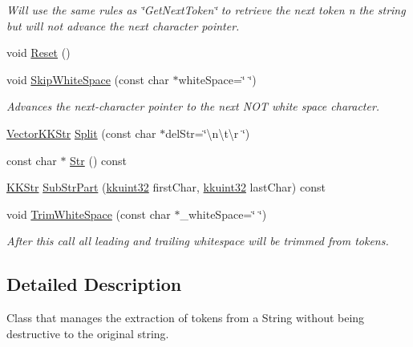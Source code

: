 \begin{DoxyCompactItemize}
\begin{DoxyCompactList}\small\item\em Will use the same rules as \char`\"{}\+Get\+Next\+Token\char`\"{} to retrieve the next token n the string but will not advance the next character pointer. \end{DoxyCompactList}\item 
void \hyperlink{class_k_k_b_1_1_k_k_str_parser_a67bd099f770d4a46a3d6f65c4112c00c}{Reset} ()
\item 
void \hyperlink{class_k_k_b_1_1_k_k_str_parser_a8e19e3cdb9d6c2aa6058d527fef76d01}{Skip\+White\+Space} (const char $\ast$white\+Space=\char`\"{} \char`\"{})
\begin{DoxyCompactList}\small\item\em Advances the next-\/character pointer to the next N\+OT white space character. \end{DoxyCompactList}\item 
\hyperlink{class_k_k_b_1_1_vector_k_k_str}{Vector\+K\+K\+Str} \hyperlink{class_k_k_b_1_1_k_k_str_parser_a625b103381cce53ddb55afe60abec4c2}{Split} (const char $\ast$del\+Str=\char`\"{}\textbackslash{}n\textbackslash{}t\textbackslash{}r \char`\"{})
\item 
const char $\ast$ \hyperlink{class_k_k_b_1_1_k_k_str_parser_a5928dc8eeb0d7e8517b5ccf0f4778d24}{Str} () const 
\item 
\hyperlink{class_k_k_b_1_1_k_k_str}{K\+K\+Str} \hyperlink{class_k_k_b_1_1_k_k_str_parser_a53939f3c505769182d8fef1fcf132031}{Sub\+Str\+Part} (\hyperlink{namespace_k_k_b_af8d832f05c54994a1cce25bd5743e19a}{kkuint32} first\+Char, \hyperlink{namespace_k_k_b_af8d832f05c54994a1cce25bd5743e19a}{kkuint32} last\+Char) const 
\item 
void \hyperlink{class_k_k_b_1_1_k_k_str_parser_a47aa0c337cc8b00c733ed59f95679aa6}{Trim\+White\+Space} (const char $\ast$\+\_\+white\+Space=\char`\"{} \char`\"{})
\begin{DoxyCompactList}\small\item\em After this call all leading and trailing whitespace will be trimmed from tokens. \end{DoxyCompactList}\end{DoxyCompactItemize}


\subsection{Detailed Description}
Class that manages the extraction of tokens from a String without being destructive to the original string. 

